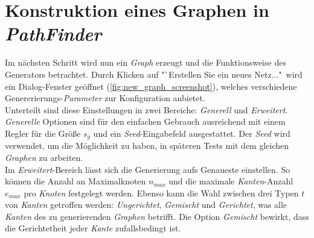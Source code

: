 \documentclass[12pt]{article}
\begin{document}
\section{Konstruktion eines Graphen in \textit{PathFinder}}
\label{sec:construct}
Im nächsten Schritt wird nun ein \textit{Graph} erzeugt und die Funktionsweise des Generators betrachtet. Durch Klicken auf "`Erstellen Sie ein neues Netz..."\ wird ein Dialog-Fenster geöffnet (\autoref{fig:new_graph_screenshot}), welches verschiedene Genererierungs-\textit{Parameter}
zur Konfiguration anbietet.
\\
Unterteilt sind diese Einstellungen in zwei Bereiche: \textit{Generell} und \textit{Erweitert}. \textit{Generelle} Optionen sind für den einfachen Gebrauch ausreichend mit einem Regler für die Größe $s_g$ und ein \textit{Seed}-Eingabefeld ausgestattet. Der \textit{Seed} wird verwendet, um die Möglichkeit zu haben, in späteren Tests mit dem gleichen \textit{Graphen} zu arbeiten.
\\
Im \textit{Erweitert}-Bereich lässt sich die Generierung aufs Genaueste einstellen. So können die Anzahl an Maximalknoten $n_{max}$ und die maximale \textit{Kanten}-Anzahl $e_{max}$ pro \textit{Knoten} festgelegt werden. Ebenso kann die Wahl zwischen drei Typen $t$ von \textit{Kanten} getroffen werden: \textit{Ungerichtet}, \textit{Gemischt} und \textit{Gerichtet}, was alle \textit{Kanten} des zu generierenden \textit{Graphen} betrifft. Die Option \textit{Gemischt} bewirkt, dass die Gerichtetheit jeder \textit{Kante} zufallsbedingt ist.
\end{document}
